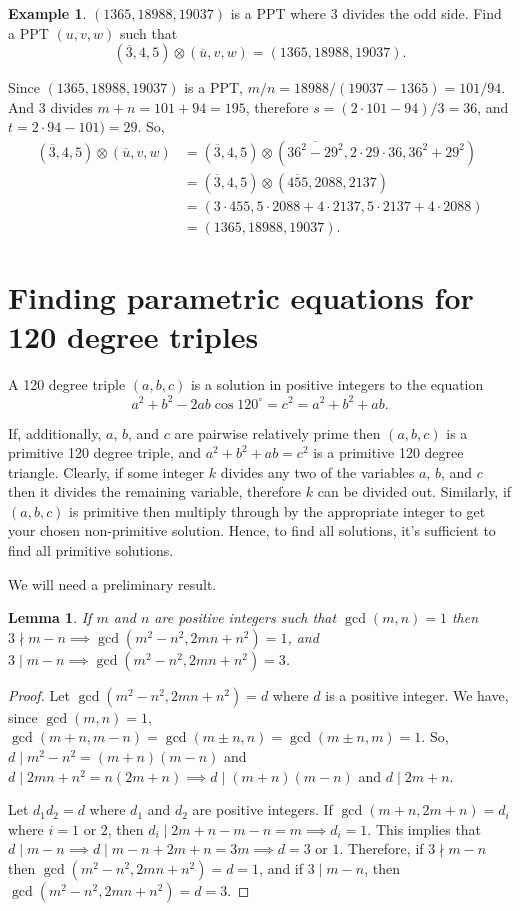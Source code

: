 \documentclass{article}
\newtheorem{lemma}{Lemma}
\theoremstyle{definition}
\newtheorem{example}{Example}[section]
\begin{document}
\begin{example}
\((1365, 18988, 19037)\) is a PPT where 3 divides the odd side. Find a PPT \((u,v,w)\) such that \[(\overline{3},4,5) \otimes (\overline{u},v,w) = (1365,
18988, 19037).\]

Since \((1365, 18988, 19037)\) is a PPT, \(m/n=18988/(19037-1365)=101/94\). And 3 divides \(m+n=101+94 = 195\), therefore \(s=(2\cdot 101-94)/3=36\), and \(t=2\cdot 94-101)=29\). So, \[\begin{aligned}
(\overline{3},4,5) \otimes (\overline{u},v,w) &= (\overline{3},4,5) \otimes (\overline{36^2-29^2}, 2\cdot 29\cdot 36, 36^2+29^2) \\
&= (\overline{3},4,5) \otimes (\overline{455},2088,2137) \\
&= (3\cdot 455, 5\cdot 2088+4\cdot 2137,  5\cdot 2137+4\cdot 2088) \\   
&= (1365, 18988, 19037).
\end{aligned}\]
\end{example}

\section{Finding parametric equations for 120 degree triples}

A 120 degree triple \((a,b,c)\) is a solution in positive integers to the equation
\begin{equation}
a^2 + b^2 - 2ab\cos 120^\circ = c^2 = a^2+b^2+ab.
\end{equation}

If, additionally, \(a\), \(b\), and \(c\) are pairwise relatively prime then \((a,b,c)\) is a primitive 120 degree triple, and \(a^2+b^2+ab=c^2\) is a primitive 120 degree triangle. Clearly, if some integer \(k\) divides any two of the variables \(a\), \(b\), and \(c\) then it divides the remaining variable, therefore \(k\) can be divided out. Similarly, if \((a,b,c)\) is primitive then multiply through by the appropriate integer to get your chosen non-primitive solution. Hence, to find all solutions, it's sufficient to find all primitive solutions.

We will need a preliminary result.
\begin{lemma}
If \(m\) and \(n\) are positive integers such that \(\gcd(m,n)=1\) then \(3\nmid m-n \implies \gcd(m^2-n^2,2mn+n^2)= 1\), and \(3\mid m-n \implies \gcd(m^2-n^2,2mn+n^2)= 3\).
\label{th:120Lemma}
\end{lemma}
\begin{proof}
Let \(\gcd(m^2-n^2,2mn+n^2)=d\) where \(d\) is a positive integer. We have, since \(\gcd(m,n)=1\), \(\gcd(m+n,m-n)=\gcd(m\pm n,n)=\gcd(m\pm n,m)=1\). So, \(d\mid m^2-n^2=(m+n)(m-n)\) and \(d\mid 2mn+n^2=n(2m+n)\implies d\mid (m+n)(m-n)\) and \(d\mid 2m+n\).

Let \(d_1d_2=d\) where \(d_1\) and \(d_2\) are positive integers. If \(\gcd(m+n,2m+n)=d_i\) where \(i=1\) or \(2\), then \(d_i\mid 2m+n-m-n=m \implies d_i=1\). This implies that \(d\mid m-n\implies d\mid m-n + 2m+n=3m \implies d=3\) or \(1\). Therefore, if  \(3\nmid m-n\) then \(\gcd(m^2-n^2,2mn+n^2)= d=1\), and if \(3\mid m-n\), then \(\gcd(m^2-n^2,2mn+n^2) =d=3\).
\end{proof}
\end{document}
